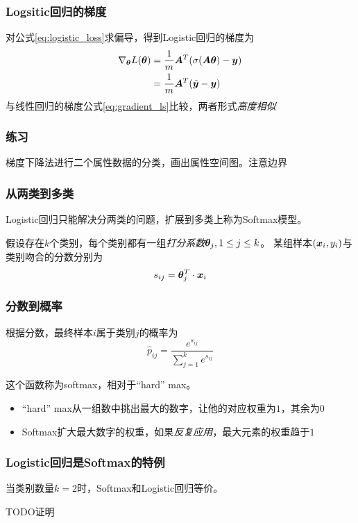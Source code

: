 \documentclass[14pt]{beamer}
\begin{document}
\begin{frame}
  \frametitle{Logsitic回归的梯度}
  对公式\ref{eq:logistic_loss}求偏导，得到Logistic回归的梯度为
  \begin{equation}
    \begin{split}
    \nabla_{\bm{\theta}}L(\bm{\theta})&=\frac{1}{m}\bm{A}^T(\sigma(\bm{A}\bm{\theta})-\bm{y})\\
    &=\frac{1}{m}\bm{A}^T(\hat{\bm{y}}-\bm{y})
    \end{split}
  \end{equation}
  与线性回归的梯度公式\ref{eq:gradient_ls}比较，两者形式\emph{高度相似}

\end{frame}

\begin{frame}
  \frametitle{练习}
  梯度下降法进行二个属性数据的分类，画出属性空间图。注意边界
  
\end{frame}

\begin{frame}
  \frametitle{从两类到多类}
  Logistic回归只能解决分两类的问题，扩展到多类上称为Softmax模型。

  假设存在$k$个类别，每个类别都有一组\emph{打分系数}$\bm{\theta}_j,1\leq j\leq k$。
  某组样本$(\bm{x}_i, y_i)$与类别吻合的分数分别为
  \begin{equation}
    s_{ij}=\bm{\theta}_j^T\cdot\bm{x}_i
  \end{equation}
\end{frame}

\begin{frame}
  \frametitle{分数到概率}
  根据分数，最终样本$i$属于类别$j$的概率为
  \begin{equation}
    \hat{p}_{ij}=\frac{e^{s_{ij}}}{\sum_{j=1}^k e^{s_{ij}}}
  \end{equation}

  这个函数称为softmax，相对于“hard” max。
  \begin{itemize}
    \item “hard” max从一组数中挑出最大的数字，让他的对应权重为$1$，其余为$0$
    \item Softmax扩大最大数字的权重，如果\emph{反复应用}，最大元素的权重趋于$1$
  \end{itemize}
\end{frame}

\begin{frame}
  \frametitle{Logistic回归是Softmax的特例}
  当类别数量$k=2$时，Softmax和Logistic回归等价。

  TODO证明
\end{frame}
\end{document}
